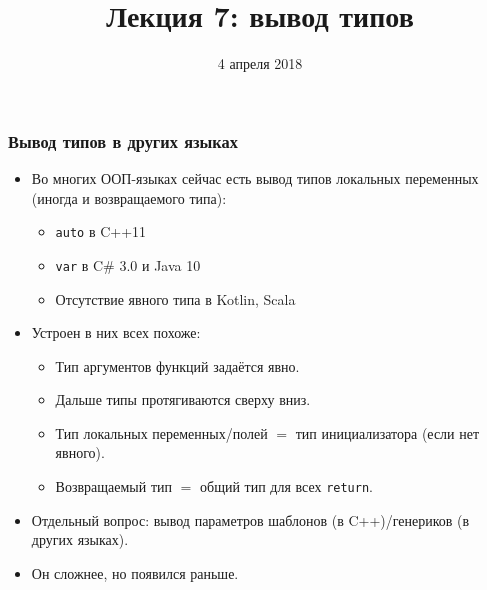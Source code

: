 \documentclass[11pt]{beamer}
\title{Лекция 7: вывод типов}
\date{4 апреля 2018}
\begin{document}
\begin{frame}[plain]
\maketitle
\end{frame}

\begin{frame}[fragile]
\frametitle{Вывод типов в других языках}
\begin{itemize}
    \item Во многих ООП-языках сейчас есть вывод типов локальных переменных (иногда и возвращаемого типа):
    \hspace{-1em}
    \pause
    \begin{itemize}
        \item \lstinline!auto! в C++11
        \item \lstinline!var! в C\# 3.0 и Java 10
        \item Отсутствие явного типа в Kotlin, Scala
    \end{itemize}
    \pause
    \item Устроен в них всех похоже:
    \begin{itemize}
        \pause
        \item Тип аргументов функций задаётся явно.
        \pause
        \item Дальше типы протягиваются сверху вниз.
        \pause
        \item Тип локальных переменных/полей $=$ тип инициализатора (если нет явного).
        \pause
        \item Возвращаемый тип $=$ общий тип для всех \lstinline!return!.
    \end{itemize}
    \pause
    \item Отдельный вопрос: вывод параметров шаблонов (в C++)/генериков (в других языках).
    \pause
    \item Он сложнее, но появился раньше.
\end{itemize}
\end{frame}
\end{document}
